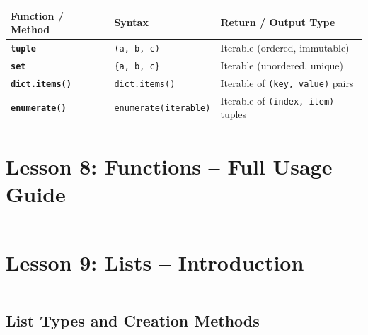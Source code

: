 \documentclass[a4paper,11pt]{article}
\begin{document}
	\begin{tabular}{>{\bfseries}p{4cm} p{7.5cm} p{3cm}}
		\toprule
		Function / Method & Syntax & Return / Output Type \\
		\midrule
		
		\texttt{tuple} & \texttt{(a, b, c)} & Iterable (ordered, immutable) \\
		
		\texttt{set} & \texttt{\{a, b, c\}} & Iterable (unordered, unique) \\
		
		\texttt{dict.items()} & \texttt{dict.items()} & Iterable of \texttt{(key, value)} pairs \\
		
		\texttt{enumerate()} & \texttt{enumerate(iterable)} & Iterable of \texttt{(index, item)} tuples \\
		
		\bottomrule
	\end{tabular}
	
	
	\section{Lesson 8: Functions – Full Usage Guide}
	\inputminted{python}{Python_Files/functions_guid.py}
	
	\section{Lesson 9: Lists – Introduction}
	\inputminted{python}{Python_Files/list_intro_guid.py}
	
	\vspace{1em}
	\subsection*{List Types and Creation Methods}
	
\end{document}

